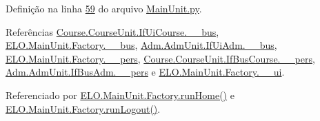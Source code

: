 Definição na linha \hyperlink{MainUnit_8py_source_l00059}{59} do arquivo \hyperlink{MainUnit_8py_source}{Main\-Unit.\-py}.



Referências \hyperlink{CourseUnit_8py_source_l00025}{Course.\-Course\-Unit.\-If\-Ui\-Course.\-\_\-\-\_\-bus}, \hyperlink{MainUnit_8py_source_l00039}{E\-L\-O.\-Main\-Unit.\-Factory.\-\_\-\-\_\-bus}, \hyperlink{AdmUnit_8py_source_l00067}{Adm.\-Adm\-Unit.\-If\-Ui\-Adm.\-\_\-\-\_\-bus}, \hyperlink{MainUnit_8py_source_l00040}{E\-L\-O.\-Main\-Unit.\-Factory.\-\_\-\-\_\-pers}, \hyperlink{CourseUnit_8py_source_l00051}{Course.\-Course\-Unit.\-If\-Bus\-Course.\-\_\-\-\_\-pers}, \hyperlink{AdmUnit_8py_source_l00112}{Adm.\-Adm\-Unit.\-If\-Bus\-Adm.\-\_\-\-\_\-pers} e \hyperlink{MainUnit_8py_source_l00038}{E\-L\-O.\-Main\-Unit.\-Factory.\-\_\-\-\_\-ui}.



Referenciado por \hyperlink{classELO_1_1MainUnit_1_1Factory_a766943202ba781821cf749ca0fb133ba}{E\-L\-O.\-Main\-Unit.\-Factory.\-run\-Home()} e \hyperlink{classELO_1_1MainUnit_1_1Factory_aa26c51486ba65030399897a6e3b4f4f1}{E\-L\-O.\-Main\-Unit.\-Factory.\-run\-Logout()}.


